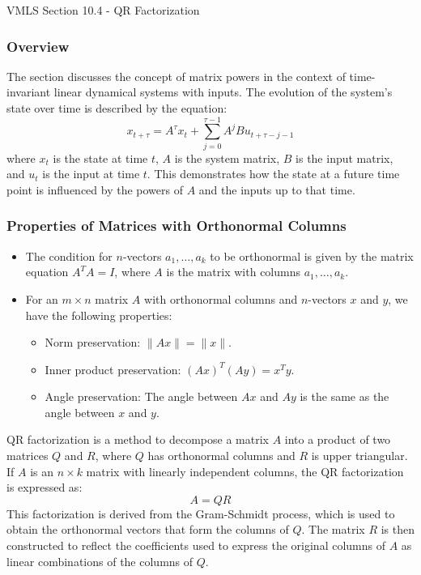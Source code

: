 \begin{notes}{VMLS Section 10.4 - QR Factorization}
    \subsubsection*{Overview}

    \begin{highlight}
        The section discusses the concept of matrix powers in the context of time-invariant linear dynamical systems with inputs. The evolution of the system's state over time is described by the equation:
        \begin{equation*}
            x_{t+\tau} = A^\tau x_t + \sum_{j=0}^{\tau-1} A^j B u_{t+\tau-j-1}
        \end{equation*}
        where $x_t$ is the state at time $t$, $A$ is the system matrix, $B$ is the input matrix, and $u_t$ is the input at time $t$. This demonstrates how the state at a future time point is influenced 
        by the powers of $A$ and the inputs up to that time.
    \end{highlight}

    
    \subsubsection*{Properties of Matrices with Orthonormal Columns}
    \begin{itemize}
        \item The condition for $n$-vectors $a_1, \ldots, a_k$ to be orthonormal is given by the matrix equation $A^T A = I$, where $A$ is the matrix with columns $a_1, \ldots, a_k$.
        \item For an $m \times n$ matrix $A$ with orthonormal columns and $n$-vectors $x$ and $y$, we have the following properties:
        \begin{itemize}
        \item Norm preservation: $\| Ax \| = \| x \|$.
        \item Inner product preservation: $(Ax)^T (Ay) = x^T y$.
        \item Angle preservation: The angle between $Ax$ and $Ay$ is the same as the angle between $x$ and $y$.
        \end{itemize}
    \end{itemize}

    \begin{highlight}[QR Factorization]
        QR factorization is a method to decompose a matrix $A$ into a product of two matrices $Q$ and $R$, where $Q$ has orthonormal columns and $R$ is upper triangular. If $A$ is an $n \times k$ matrix 
        with linearly independent columns, the QR factorization is expressed as:
        \begin{equation*}
            A = QR
        \end{equation*}
        This factorization is derived from the Gram-Schmidt process, which is used to obtain the orthonormal vectors that form the columns of $Q$. The matrix $R$ is then constructed to reflect the 
        coefficients used to express the original columns of $A$ as linear combinations of the columns of $Q$.
    \end{highlight}
    

\end{notes}
